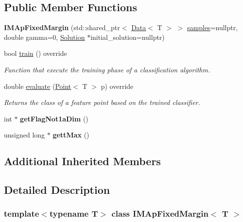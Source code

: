 \subsection*{Public Member Functions}
\begin{DoxyCompactItemize}
\item 
\mbox{\label{class_i_m_ap_fixed_margin_a90724da378b06629c891dea9fa49e379}} 
{\bfseries I\+M\+Ap\+Fixed\+Margin} (std\+::shared\+\_\+ptr$<$ \hyperlink{class_data}{Data}$<$ T $>$ $>$ \hyperlink{class_classifier_a0000b47a2e0784ada4c52d7046c4adb8}{samples}=nullptr, double gamma=0, \hyperlink{class_solution}{Solution} $\ast$initial\+\_\+solution=nullptr)
\item 
bool \hyperlink{class_i_m_ap_fixed_margin_a4d99742be5fe5a21b8ae6f99547a98c8}{train} () override
\begin{DoxyCompactList}\small\item\em Function that execute the training phase of a classification algorithm. \end{DoxyCompactList}\item 
double \hyperlink{class_i_m_ap_fixed_margin_a909eb58c78c20780494598b478f8846f}{evaluate} (\hyperlink{class_point}{Point}$<$ T $>$ p) override
\begin{DoxyCompactList}\small\item\em Returns the class of a feature point based on the trained classifier. \end{DoxyCompactList}\item 
\mbox{\label{class_i_m_ap_fixed_margin_ac928b3c55da2171adce3231223f85d42}} 
int $\ast$ {\bfseries get\+Flag\+Not1a\+Dim} ()
\item 
\mbox{\label{class_i_m_ap_fixed_margin_a90bd97bde25c511399400a85a5f786e2}} 
unsigned long $\ast$ {\bfseries gett\+Max} ()
\end{DoxyCompactItemize}
\subsection*{Additional Inherited Members}


\subsection{Detailed Description}
\subsubsection*{template$<$typename T$>$\newline
class I\+M\+Ap\+Fixed\+Margin$<$ T $>$}

